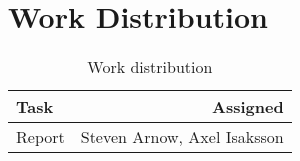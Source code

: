 \section{Work Distribution}
\begin{table}[h]
\centering
\begin{tabular}{| l | r |}
	\hline
	Task & Assigned \\\hline
	Report & Steven Arnow, Axel Isaksson \\
	
	\hline
\end{tabular}
\caption{Work distribution}
\label{tab:work}
\end{table}
